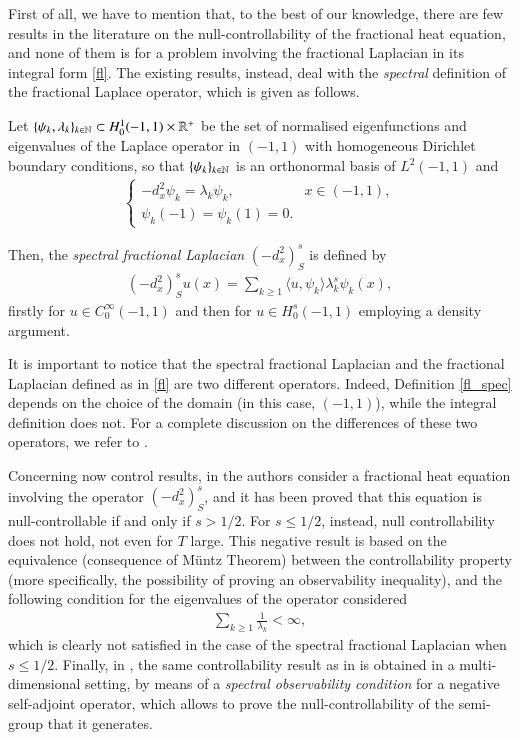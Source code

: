 First of all, we have to mention that, to the best of our knowledge, there are few results in the literature on the null-controllability of the fractional heat equation, and none of them is for a problem involving the fractional Laplacian in its integral form \eqref{fl}. The existing results, instead, deal with the \textit{spectral} definition of the fractional Laplace operator, which is given as follows.

Let $\{\psi_k,\lambda_k\}_{k\in\mathbb{N}}\subset H_0^1(-1,1)\times\mathbb{R}^+$ be the set of normalised eigenfunctions and eigenvalues of the Laplace operator in $(-1,1)$ with homogeneous Dirichlet boundary conditions, so that $\{\psi_k\}_{k\in\mathbb{N}}$ is an orthonormal basis of $L^2(-1,1)$ and         
\begin{align*}
	\begin{cases}
		-d_x^2\psi_k =\lambda_k\psi_k, & x\in (-1,1), 
		\\
		\psi_k(-1)=\psi_k(1)=0.
	\end{cases}
\end{align*}

Then, the \textit{spectral fractional Laplacian} $(-d_x^2)^s_S$ is defined by
\begin{align}\label{fl_spec}
	(-d_x^2)^s_S u(x) = \sum_{k\geq 1}\langle u,\psi_k\rangle \lambda_k^s\psi_k(x),
\end{align}
firstly for $u\in C_0^{\infty}(-1,1)$ and then for $u\in H_0^s(-1,1)$ employing a density argument.

It is important to notice that the spectral fractional Laplacian and the fractional Laplacian defined as in \eqref{fl} are two different operators. Indeed, Definition \eqref{fl_spec} depends on the choice of the domain (in this case, $(-1,1)$), while the integral definition does not. For a complete discussion on the differences of these two operators, we refer to \cite{servadei2014spectrum}.

Concerning now control results, in \cite{micu2006controllability} the authors consider a fractional heat equation involving the operator $(-d_x^2)^s_S$, and it has been proved that this equation is null-controllable if and only if $s>1/2$. For $s\leq 1/2$, instead, null controllability does not hold, not even for $T$ large. This negative result is based on the equivalence (consequence of M\"untz Theorem) between the controllability property (more specifically, the possibility of proving an observability inequality), and the following condition for the eigenvalues of the operator considered
%
\begin{align}\label{eigen_cond}
	\sum_{k\geq 1} \frac{1}{\lambda_k}<\infty,
\end{align} 
%
which is clearly not satisfied in the case of the spectral fractional Laplacian when $s\leq 1/2$. Finally, in \cite{miller2006controllability}, the same controllability result as in \cite{micu2006controllability} is obtained in a multi-dimensional setting, by means of a  \textit{spectral observability condition} for a negative self-adjoint operator, which allows to prove the null-controllability of the semi-group that it generates.

